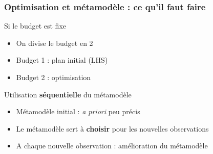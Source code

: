 \documentclass{beamer}
\begin{document}
\begin{frame}
\frametitle{Optimisation et métamodèle : ce qu'il faut faire}
\begin{block}{Si le budget est fixe}
 \begin{itemize}
  \item On divise le budget en 2
  \item Budget 1 : plan initial (LHS)
  \item Budget 2 : optimisation
 \end{itemize}
\end{block}

\begin{block}{Utilisation \textbf{séquentielle} du métamodèle}
 \begin{itemize}
  \item Métamodèle initial : \textit{a priori} peu précis
  \item Le métamodèle sert à \textbf{choisir} pour les nouvelles observations
  \item A chaque nouvelle observation : amélioration du métamodèle
 \end{itemize}
\end{block}
\end{frame}

% 
%    
%    
%    
%    
%   
%   

\end{document}
